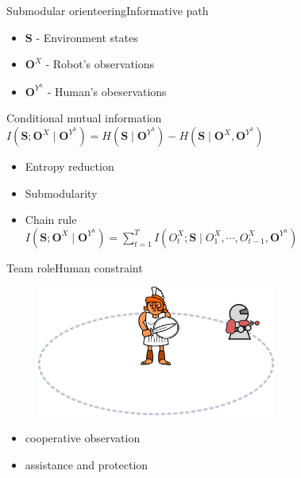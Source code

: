 \begin{frame}{Submodular orienteering}{Informative path}
	\begin{itemize}
	\item $ \mathbf{S} $ - Environment states
	\item $ \mathbf{O}^{X} $ - Robot's observations
	\item $ \mathbf{O}^{Y^{h}} $ - Human's obeservations
	\end{itemize}
	\begin{block}{Conditional mutual information}
		$ I(\mathbf{S}; \mathbf{O}^{X} \mid \mathbf{O}^{Y^{h}}) = H(\mathbf{S} \mid \mathbf{O}^{Y^{h}}) - H(\mathbf{S} \mid \mathbf{O}^{X},\mathbf{O}^{Y^{h}}) $
	\end{block} 
	
	\bigskip
	
	\begin{itemize}
		\item Entropy reduction
		\item Submodularity
		\item Chain rule \\
		$ I(\mathbf{S}; \mathbf{O}^{X} \mid \mathbf{O}^{Y^{h}}) = \sum_{t=1}^{T} I(O^{X}_{t} ; \mathbf{S} \mid O^{X}_{1} , \cdots , O^{X}_{t-1}, \mathbf{O}^{Y^{h}}) $
	\end{itemize}
	
\end{frame}


\begin{frame}{Team role}{Human constraint}
	
	\begin{figure}
		\centering
		\includegraphics[width = 0.7\textwidth]{./figure/human_robot_interaction}
	\end{figure}
	
	\begin{itemize}
		\item cooperative observation
		\item assistance and protection
	\end{itemize}
	
\end{frame}

